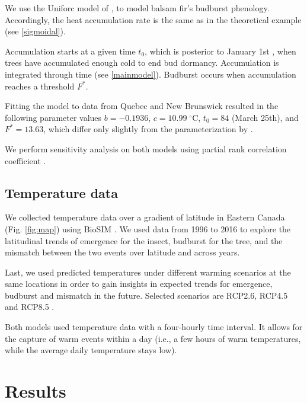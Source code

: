 \documentclass[12 pt]{article}
\begin{document}
We use the Uniforc model of \citep{Chuine2000}, to model balsam fir's budburst phenology. Accordingly, the heat accumulation rate is the same as in the theoretical example (see \ref{sigmoidal}).\par
Accumulation starts at a given time $t_0$, which is posterior to January 1st \citep{Desbiens2007}, when trees have accumulated enough cold to end bud dormancy. Accumulation is integrated through time (see \ref{mainmodel}). Budburst occurs when accumulation reaches a threshold $F^*$.\par
Fitting the model to data from Quebec and New Brunswick \citep{Desbiens2007} resulted in the following parameter values $b  = -0.1936$, $c = 10.99 \; ^{\circ}\text{C}$, $t_0 = 84$ (March 25th), and $F^*  = 13.63$, which differ only slightly from the parameterization by \cite{Desbiens2007}.\par
We perform sensitivity analysis on both models using partial rank correlation coefficient \citep{Wu2013}. 

\subsection{Temperature data}
We collected temperature data over a gradient of latitude in Eastern Canada (Fig. \ref{fig:map}) using BioSIM \citep{Regniere2014}. We used data from 1996 to 2016 to explore the latitudinal trends of emergence for the insect, budburst for the tree, and the mismatch between the two events over latitude and across years. \par
Last, we used predicted temperatures under different warming scenarios at the same locations in order to gain insights in expected trends for emergence, budburst and mismatch in the future. Selected scenarios are RCP2.6, RCP4.5 and RCP8.5 \citep{Vuuren2011}. \par
Both models used temperature data with a four-hourly time interval. It allows for the capture of warm events within a day (i.e., a few hours of warm temperatures, while the average daily temperature stays low). 

\section{Results}
\end{document}
